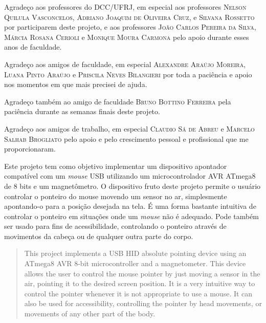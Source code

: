 \documentclass[brazil,pagestart=firstchapter]{abnt}
\begin{document}

Agradeço aos professores do DCC/UFRJ, em especial aos professores
\textsc{Nelson Quilula Vasconcelos},
\textsc{Adriano Joaquim de Oliveira Cruz}, e
\textsc{Silvana Rossetto} por participarem deste projeto,
e aos professores
\textsc{João Carlos Pereira da Silva},
\textsc{Márcia Rosana Cerioli} e
\textsc{Monique Moura Carmona} pelo apoio durante esses anos de faculdade.

Agradeço aos amigos de faculdade, em especial
\textsc{Alexandre Araújo Moreira},
\textsc{Luana Pinto Araújo} e
\textsc{Priscila Neves Bilangieri} por toda a paciência e apoio nos
momentos em que mais precisei de ajuda.

Agradeço também ao amigo de faculdade
\textsc{Bruno Bottino Ferreira} pela paciência durante as semanas finais
deste projeto.

Agradeço aos amigos de trabalho, em especial
\textsc{Claudio Sá de Abreu} e
\textsc{Marcelo Salhab Brogliato} pelo apoio e pelo crescimento pessoal e
profissional que me proporcionaram.


\begin{resumo}
Este projeto tem como objetivo implementar um dispositivo apontador
compatível com um \textit{mouse} USB utilizando um microcontrolador AVR
ATmega8 de 8 bits e um magnetômetro. O dispositivo fruto deste projeto
permite o usuário controlar o ponteiro do mouse movendo um sensor no ar,
simplesmente apontando-o para a posição desejada na tela. É uma forma
bastante intuitiva de controlar o ponteiro em situações onde um
\textit{mouse} não é adequado. Pode também ser usado para fins de
acessibilidade, controlando o ponteiro através de movimentos da cabeça ou de
qualquer outra parte do corpo.
\end{resumo}

\begin{abstract}
This project implements a USB HID absolute pointing device using an ATmega8
AVR 8-bit microcontroller and a magnetometer. This device allows the user to
control the mouse pointer by just moving a sensor in the air, pointing it to
the desired screen position. It is a very intuitive way to control the
pointer whenever it is not appropriate to use a mouse. It can also be used
for accessibility, controlling the pointer by head movements, or movements
of any other part of the body.
\end{abstract}


\listoffigures

\end{document}
